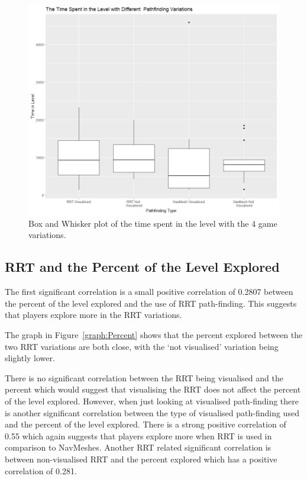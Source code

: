 \documentclass[journal]{IEEEtran}
\begin{document}
	\begin{figure}[h]
		\includegraphics[width=1.0\linewidth]{GraphTime.png}
		\caption{Box and Whisker plot of the time spent in the level with the 4 game variations.}
		\label{graph:Time}
	\end{figure}  
	
	
	
	\subsection{RRT and the Percent of the Level Explored} \label{RRTExplore}
	The first significant correlation is a small positive correlation of 0.2807 between the percent of the level explored and the use of RRT path-finding. This suggests that players explore more in the RRT variations.        
	
	The graph in Figure~\ref{graph:Percent} shows that the percent explored between the two RRT variations are both close, with the `not visualised' variation being slightly lower. 
	
	There is no significant correlation between the RRT being visualised and the percent which would suggest that visualising the RRT does not affect the percent of the level explored. However, when just looking at visualised path-finding there is another significant correlation between the type of visualised path-finding used and the percent of the level explored. There is a strong positive correlation of 0.55 which again suggests that players explore more when RRT is used in comparison to NavMeshes. Another RRT related significant correlation is between non-visualised RRT and the percent explored which has a positive correlation of 0.281.  
	
\end{document}
